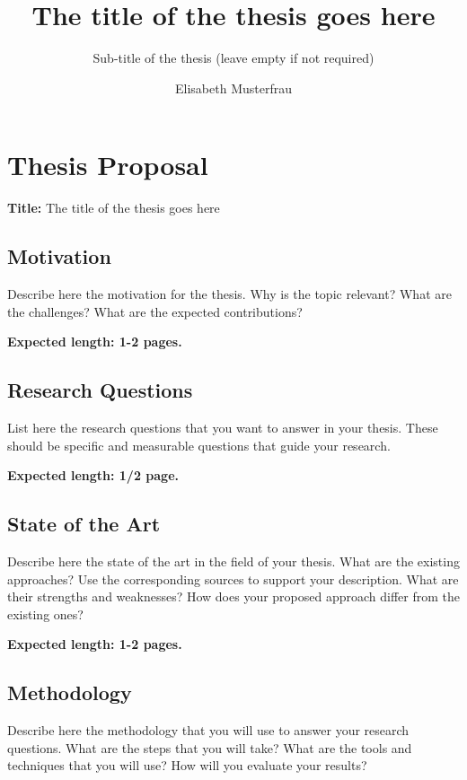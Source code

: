 \documentclass{imc-rai}
\title{The title of the thesis goes here}
\subtitle{Sub-title of the thesis (leave empty if not required)}
\author{Elisabeth Musterfrau}
\begin{document}
\frontmatter\maketitle{}



\mainmatter%

\chapter*{Thesis Proposal}

{\Large\textbf{Title: } The title of the thesis goes here}

\section*{Motivation}

Describe here the motivation for the thesis. Why is the topic relevant? What are the challenges? What are the expected contributions?

\noindent \textbf{Expected length: 1-2 pages.}

\section*{Research Questions}

List here the research questions that you want to answer in your thesis. These should be specific and measurable questions that guide your research.

\noindent \textbf{Expected length: 1/2 page.}

\section*{State of the Art}

Describe here the state of the art in the field of your thesis. What are the existing approaches? Use the corresponding sources \cite{988366} to support your description.
What are their strengths and weaknesses? How does your proposed approach differ from the existing ones?

\noindent \textbf{Expected length: 1-2 pages.}

\section*{Methodology}

Describe here the methodology that you will use to answer your research questions. What are the steps that you will take? What are the tools and techniques that you will use? How will you evaluate your results?
\end{document}
